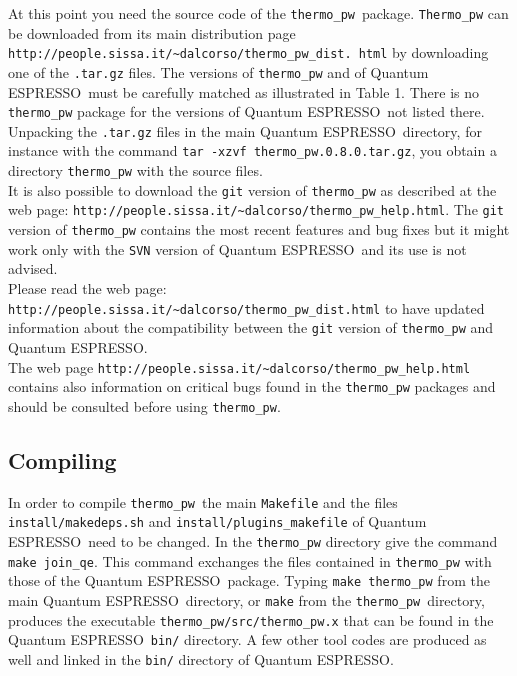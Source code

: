 \documentclass[12pt,a4paper]{article}
\def\qe{{\sc Quantum ESPRESSO}}
\def\thermo{\texttt{thermo\_pw}}
\begin{document}
At this point you need the source code of the \thermo\ package. 
\texttt{Thermo\_pw} can be downloaded from its main distribution page
\texttt{http://people.sissa.it/\textasciitilde dalcorso/thermo\_pw\_dist. html}
by downloading one of the \texttt{.tar.gz} files.
The versions of \texttt{thermo\_pw} and of \qe\ must be carefully matched
as illustrated in Table 1. 
There is no \texttt{thermo\_pw} package for the versions of \qe\ not listed 
there. Unpacking the \texttt{.tar.gz} files in the main \qe\ directory, for
instance with the command \texttt{tar -xzvf thermo\_pw.0.8.0.tar.gz}, you
obtain a directory \texttt{thermo\_pw} with the source files. \\
It is also possible to download the \texttt{git} version of 
\texttt{thermo\_pw} as described at
the web page: 
\texttt{http://people.sissa.it/\textasciitilde dalcorso/thermo\_pw\_help.html}.
The \texttt{git} version of \texttt{thermo\_pw} contains the most recent
features and bug fixes but it might work only with the \texttt{SVN} 
version of \qe\ and its use is not advised. \\
Please read the web page: 
\texttt{http://people.sissa.it/\textasciitilde dalcorso/thermo\_pw\_dist.html} 
to have updated information about the compatibility between the \texttt{git} 
version of \texttt{thermo\_pw} and \qe. \\
The web page \texttt{http://people.sissa.it/\textasciitilde dalcorso/thermo\_pw\_help.html}
contains also information on critical bugs found in the 
\texttt{thermo\_pw} packages and should be consulted before using 
\texttt{thermo\_pw}.

\subsection{\color{web-blue}Compiling}

In order to compile \thermo\ the main \texttt{Makefile} and the files
\texttt{install/makedeps.sh} and \texttt{install/plugins\_makefile}
of \qe\ need to be changed. In the \texttt{thermo\_pw}
directory give the command \texttt{make join\_qe}. This command exchanges
the files contained in \texttt{thermo\_pw} with those of the \qe\ package.
Typing \texttt{make thermo\_pw} from the main \qe\ directory, or \texttt{make} 
from the \texttt{thermo\_pw}\ directory, produces the executable
\texttt{thermo\_pw/src/thermo\_pw.x} that can be found in the 
\qe\ \texttt{bin/} directory. A few other tool codes are produced as well
and linked in the \texttt{bin/} directory of \qe.
\end{document}
